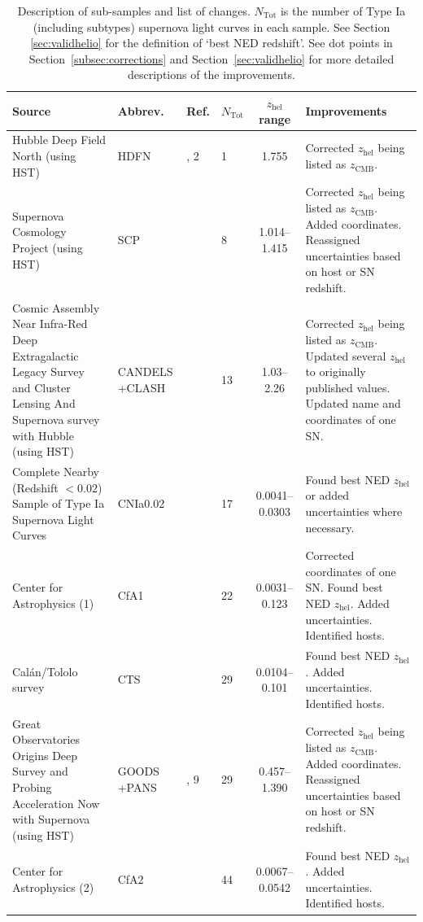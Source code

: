 \documentclass[
  journal=pasa,
  manuscript=research-paper,
  year=2022,
]{cup-journal}
\newcommand{\zCMB}[1]{\ensuremath{z_{\text{CMB}}^{\mathrm{#1}}}}
\newcommand\zhel{\ensuremath{z_{\text{hel}}}}
\begin{document}
\begin{table}
\renewcommand{\arraystretch}{0.95}
\begin{threeparttable}[hbt!]
\caption{Description of sub-samples and list of changes. $N_{\text{Tot}}$ is the number of Type Ia (including subtypes) supernova light curves in each sample. See Section \ref{sec:validhelio} for the definition of `best NED redshift'. See dot points in Section~\ref{subsec:corrections} and Section~\ref{sec:validhelio} for more detailed descriptions of the improvements. \label{tab:panthplus_description}}
\begin{tabular}{p{5cm}p{1.2cm}p{0.9cm}lcp{6cm}}
\toprule
Source & Abbrev. &  Ref. & $N_{\text{Tot}}$ & \zhel{} range & Improvements \\
\midrule
Hubble Deep Field North (using HST) & HDFN & \centering 1, 2 & 1 & 1.755 & Corrected \zhel{} being listed as \zCMB{}.\\
Supernova Cosmology Project (using HST) & SCP & \centering 3 & 8 & 1.014--1.415 & Corrected \zhel{} being listed as \zCMB{}. Added coordinates. Reassigned uncertainties based on host or SN redshift.\\
Cosmic Assembly Near Infra-Red Deep Extragalactic Legacy Survey and Cluster Lensing And Supernova survey with Hubble (using HST) & CANDELS +CLASH & \centering 4 & 13 & 1.03--2.26 & Corrected \zhel{} being listed as \zCMB{}. Updated several \zhel{} to originally published values. Updated name and coordinates of one SN.\tnote{a}\\
Complete Nearby (Redshift $<0.02$) Sample of Type Ia Supernova Light Curves & CNIa0.02 & \centering 5 & 17 & 0.0041--0.0303 & Found best NED \zhel{} or added uncertainties where necessary. \\
Center for Astrophysics (1) & CfA1 & \centering 6 & 22 & 0.0031--0.123 & Corrected coordinates of one SN. Found best NED \zhel{}. Added uncertainties. Identified hosts.\\
Cal\'{a}n/Tololo survey & CTS & \centering 7 & 29 & 0.0104--0.101 & Found best NED \zhel{}. Added uncertainties. Identified hosts.\\
Great Observatories Origins Deep Survey and Probing Acceleration Now with Supernova (using HST) & GOODS +PANS & \centering 8, 9 & 29 & 0.457--1.390 & Corrected \zhel{} being listed as \zCMB{}. Added coordinates. Reassigned uncertainties based on host or SN redshift.\\
Center for Astrophysics (2) & CfA2 & \centering 10 & 44 & 0.0067--0.0542 & Found best NED \zhel{}. Added uncertainties. Identified hosts.\\

\end{tabular}
\end{threeparttable}
\end{table}
\end{document}
